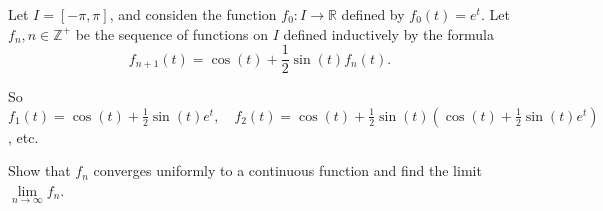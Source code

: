 \documentclass[../hw5]{subfiles}
\begin{document}
Let $I=[-\pi,\pi]$, and considen the function $f_0:I\to \mathbb{R}$ defined by $f_0(t)=e^t$. Let $f_n,n\in\mathbb{Z}^+$ be the sequence of functions on $I$ defined inductively by the formula
\[f_{n+1}(t)=\cos{(t)}+\frac{1}{2}\sin{(t)}f_n(t).\]

So $f_1(t)=\cos{(t)}+\frac{1}{2}\sin{(t)}e^t,\quad f_2(t)=\cos{(t)}+\frac{1}{2}\sin{(t)}\left( \cos{(t)}+\frac{1}{2}\sin{(t)}e^t \right)$, etc.

Show that $f_n$ converges uniformly to a continuous function and find the limit $\lim\limits_{n\to\infty}f_n$.
\end{document}
